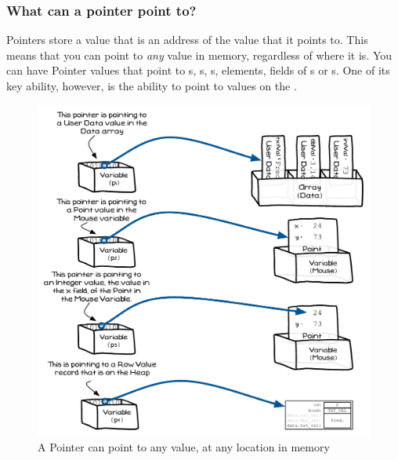 \clearpage
\subsubsection{What can a pointer point to?} %
\label{ssub:what_can_a_pointer_point_to_}

Pointers store a value that is an address of the value that it points to. This means that you can point to \emph{any} value in memory, regardless of where it is. You can have Pointer values that point  to s, s, s,  elements, fields of s or s. One of its key ability, however, is the ability to point to values on the .

\begin{figure}[h]
   \centering
   \includegraphics[width=\textwidth]{./topics/dynamic-memory/diagrams/PointerPointing} 
   \caption{A Pointer can point to any value, at any location in memory}
   \label{fig:pointer-pointing}
\end{figure}


